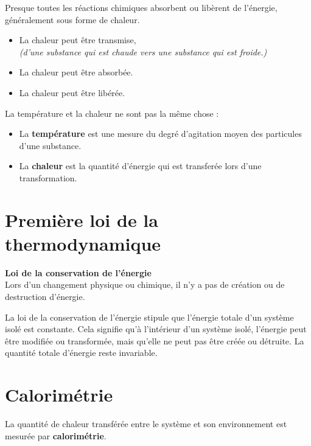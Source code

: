 \documentclass[
  11pt,
  a4paper,
  openany]{book}
\providecommand{\tightlist}{%
  \setlength{\itemsep}{0pt}\setlength{\parskip}{0pt}}
\begin{document}
Presque toutes les réactions chimiques absorbent ou libèrent de l'énergie, généralement sous forme de chaleur.

\begin{itemize}
\tightlist
\item
  La chaleur peut être transmise,\\
  \emph{(d'une substance qui est chaude vers une substance qui est froide.)}
\item
  La chaleur peut être absorbée.
\item
  La chaleur peut être libérée.
\end{itemize}

La température et la chaleur ne sont pas la même chose :

\begin{itemize}
\tightlist
\item
  La \textbf{température} est une mesure du degré d'agitation moyen des particules d'une substance.
\item
  La \textbf{chaleur} est la quantité d'énergie qui est transferée lors d'une transformation.
\end{itemize}

\section{Première loi de la thermodynamique}\label{premiuxe8re-loi-de-la-thermodynamique}

\begin{tcolorbox}
\textbf{Loi de la conservation de l'énergie}\\
Lors d'un changement physique ou chimique, il n'y a pas de création ou de destruction d'énergie.

\end{tcolorbox}

La loi de la conservation de l'énergie stipule que l'énergie totale d'un système isolé est constante. Cela signifie qu'à l'intérieur d'un système isolé, l'énergie peut être modifiée ou transformée, mais qu'elle ne peut pas être créée ou détruite. La quantité totale d'énergie reste invariable.

\section{Calorimétrie}\label{calorimuxe9trie}

La quantité de chaleur transférée entre le système et son environnement est mesurée par \textbf{calorimétrie}.
\end{document}
